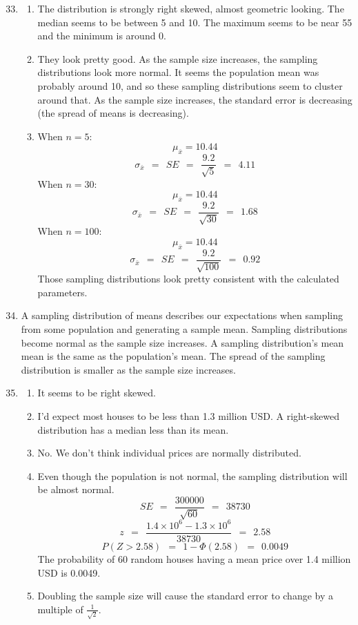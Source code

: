 \documentclass[12pt,letterpaper]{article}
\begin{document}
\newcommand{\N}[2]{\mathcal{N}\big(#1,~#2\big)}
\newcommand{\Geo}[1]{\texttt{Geo}\big(#1\big)}
\newcommand{\B}[2]{\mathcal{B}\big(#1,~#2\big)}
\newcommand{\AND}{\textsc{~and~}}
\newcommand{\OR}{\textsc{~or~}}
\newcommand{\zs}{z^{\star}}

\begin{enumerate}
\setcounter{enumi}{32}

\item \begin{enumerate}
\item The distribution is strongly right skewed, almost geometric looking. The median seems to be between 5 and 10. The maximum seems to be near 55 and the minimum is around 0.
\item They look pretty good. As the sample size increases, the sampling distributions look more normal. It seems the population mean was probably around 10, and so these sampling distributions seem to cluster around that. As the sample size increases, the standard error is decreasing (the spread of means is decreasing).
\item When $n=5$:
$$\mu_{\bar{x}} = 10.44 $$
$$\sigma_{\bar{x}} ~~=~~ SE ~~=~~ \frac{9.2}{\sqrt{5}} ~~=~~ 4.11 $$
When $n=30$:
$$\mu_{\bar{x}} = 10.44 $$
$$\sigma_{\bar{x}} ~~=~~ SE ~~=~~ \frac{9.2}{\sqrt{30}} ~~=~~ 1.68 $$
When $n=100$:
$$\mu_{\bar{x}} = 10.44 $$
$$\sigma_{\bar{x}} ~~=~~ SE ~~=~~ \frac{9.2}{\sqrt{100}} ~~=~~ 0.92 $$
Those sampling distributions look pretty consistent with the calculated parameters.
\end{enumerate}

\item A sampling distribution of means describes our expectations when sampling from some population and generating a sample mean. Sampling distributions become normal as the sample size increases. A sampling distribution's mean mean is the same as the population's mean. The spread of the sampling distribution is smaller as the sample size increases.

\item \begin{enumerate}
\item It seems to be right skewed. 
\item I'd expect most houses to be less than 1.3 million USD. A right-skewed distribution has a median less than its mean.
\item No. We don't think individual prices are normally distributed.
\item Even though the population is not normal, the sampling distribution will be almost normal.
$$SE ~~=~~ \frac{300000}{\sqrt{60}} ~~=~~ 38730 $$
$$z ~~=~~ \frac{1.4\times 10^6 - 1.3 \times 10^6}{38730} ~~=~~ 2.58 $$
$$P(Z>2.58) ~~=~~ 1-\Phi(2.58) ~~=~~  0.0049 $$
The probability of 60 random houses having a mean price over 1.4 million USD is 0.0049.
\item Doubling the sample size will cause the standard error to change by a multiple of $\frac{1}{\sqrt{2}}$.
\end{enumerate}


\end{enumerate}
\end{document}
